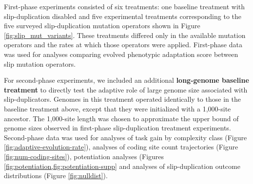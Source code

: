 First-phase experiments consisted of six treatments: one baseline treatment with slip-duplication disabled and five experimental treatments corresponding to the five surveyed slip-duplication mutation operators shown in Figure \ref{fig:slip_mut_variants}.
These treatments differed only in the available mutation operators and the rates at which those operators were applied.
First-phase data was used for analyses comparing evolved phenotypic adaptation score between slip mutation operators.


For second-phase experiments, we included an additional \textbf{long-genome baseline treatment} to directly test the adaptive role of large genome size associated with slip-duplicators.
Genomes in this treatment operated identically to those in the baseline treatment above, except that they were initialized with a 1,000-site ancestor.
The 1,000-site length was chosen to approximate the upper bound of genome sizes observed in first-phase slip-duplication treatment experiments.
Second-phase data was used for analyses of task gain by complexity class (Figure \ref{fig:adaptive-evolution-rate}), analyses of coding site count trajectories (Figure \ref{fig:num-coding-sites}), potentiation analyses (Figures \cref{fig:potentiation,fig:potentiation-supp} and analyses of slip-duplication outcome distributions (Figure \ref{fig:nulldist}).


